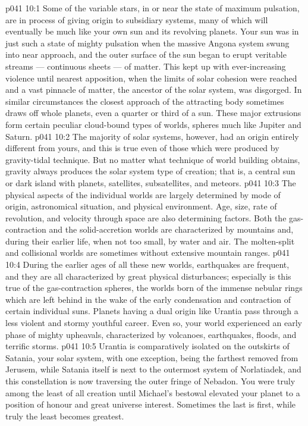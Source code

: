 \vs p041 10:1 Some of the variable stars, in or near the state of maximum pulsation, are in process of giving origin to subsidiary systems, many of which will eventually be much like your own sun and its revolving planets. Your sun was in just such a state of mighty pulsation when the massive Angona system swung into near approach, and the outer surface of the sun began to erupt veritable streams --- continuous sheets --- of matter. This kept up with ever\hyp{}increasing violence until nearest apposition, when the limits of solar cohesion were reached and a vast pinnacle of matter, the ancestor of the solar system, was disgorged. In similar circumstances the closest approach of the attracting body sometimes draws off whole planets, even a quarter or third of a sun. These major extrusions form certain peculiar cloud\hyp{}bound types of worlds, spheres much like Jupiter and Saturn.
\vs p041 10:2 The majority of solar systems, however, had an origin entirely different from yours, and this is true even of those which were produced by gravity\hyp{}tidal technique. But no matter what technique of world building obtains, gravity always produces the solar system type of creation; that is, a central sun or dark island with planets, satellites, subsatellites, and meteors.
\vs p041 10:3 \pc The physical aspects of the individual worlds are largely determined by mode of origin, astronomical situation, and physical environment. Age, size, rate of revolution, and velocity through space are also determining factors. Both the gas\hyp{}contraction and the solid\hyp{}accretion worlds are characterized by mountains and, during their earlier life, when not too small, by water and air. The molten\hyp{}split and collisional worlds are sometimes without extensive mountain ranges.
\vs p041 10:4 During the earlier ages of all these new worlds, earthquakes are frequent, and they are all characterized by great physical disturbances; especially is this true of the gas\hyp{}contraction spheres, the worlds born of the immense nebular rings which are left behind in the wake of the early condensation and contraction of certain individual suns. Planets having a dual origin like Urantia pass through a less violent and stormy youthful career. Even so, your world experienced an early phase of mighty upheavals, characterized by volcanoes, earthquakes, floods, and terrific storms.
\vs p041 10:5 \pc Urantia is comparatively isolated on the outskirts of Satania, your solar system, with one exception, being the farthest removed from Jerusem, while Satania itself is next to the outermost system of Norlatiadek, and this constellation is now traversing the outer fringe of Nebadon. You were truly among the least of all creation until Michael’s bestowal elevated your planet to a position of honour and great universe interest. Sometimes the last is first, while truly the least becomes greatest.
